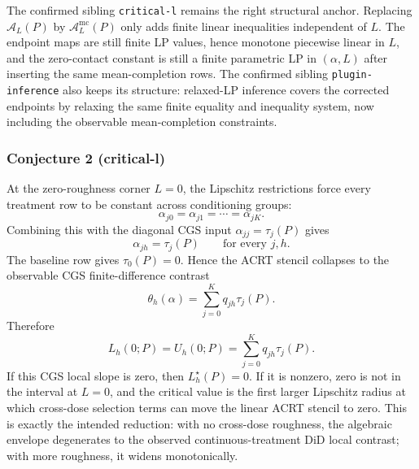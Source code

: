 \documentclass[11pt]{article}
\theoremstyle{definition}
\theoremstyle{plain}
\theoremstyle{remark}
\begin{document}
The confirmed sibling \texttt{critical-l} remains the right structural anchor.
Replacing \(\mathcal A_L(P)\) by \(\mathcal A_L^{\mathrm{mc}}(P)\) only adds
finite linear inequalities independent of \(L\).  The endpoint maps are still
finite LP values, hence monotone piecewise linear in \(L\), and the zero-contact
constant is still a finite parametric LP in \((\alpha,L)\) after inserting the
same mean-completion rows.  The confirmed sibling \texttt{plugin-inference}
also keeps its structure: relaxed-LP inference covers the corrected endpoints
by relaxing the same finite equality and inequality system, now including the
observable mean-completion constraints.

\subsubsection*{Conjecture 2 (critical-l)}
At the zero-roughness corner \(L=0\), the Lipschitz restrictions force every
treatment row to be constant across conditioning groups:
\[
  \alpha_{j0}=\alpha_{j1}=\cdots=\alpha_{jK}.
\]
Combining this with the diagonal CGS input \(\alpha_{jj}=\tau_j(P)\) gives
\[
  \alpha_{j h}=\tau_j(P)\qquad\text{for every }j,h.
\]
The baseline row gives \(\tau_0(P)=0\).  Hence the ACRT stencil collapses to
the observable CGS finite-difference contrast
\[
  \theta_h(\alpha)
  =
  \sum_{j=0}^K q_{jh}\tau_j(P).
\]
Therefore
\[
  L_h(0;P)=U_h(0;P)=\sum_{j=0}^K q_{jh}\tau_j(P).
\]
If this CGS local slope is zero, then \(L_h^\star(P)=0\).  If it is nonzero,
zero is not in the interval at \(L=0\), and the critical value is the first
larger Lipschitz radius at which cross-dose selection terms can move the
linear ACRT stencil to zero.  This is exactly the intended reduction: with no
cross-dose roughness, the algebraic envelope degenerates to the observed
continuous-treatment DiD local contrast; with more roughness, it widens
monotonically.
\end{document}
